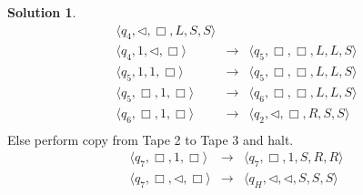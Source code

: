 \documentclass[12pt,a4paper]{article}
\theoremstyle{definition}
\newtheorem*{solution}{Solution}
\numberwithin{equation}{section}
\numberwithin{figure}{section}
\begin{document}
\begin{enumerate}
\begin{solution}
\begin{eqnarray*}
    \langle q_4, \triangleleft,\Box, L, S, S   \rangle \\
     \langle q_4,1,\triangleleft,  \Box  \rangle & \rightarrow &
    \langle q_5, \Box,\Box, L, L, S   \rangle \\
     \langle q_5,1,1,  \Box  \rangle & \rightarrow &
    \langle q_5, \Box,\Box, L, L, S   \rangle \\
    \langle q_5, \Box ,1,  \Box  \rangle & \rightarrow &
    \langle q_6, \Box,\Box, L, L, S   \rangle \\
    \langle q_6, \Box ,1,  \Box  \rangle & \rightarrow &
    \langle q_2, \triangleleft,\Box, R, S, S   \rangle \\
    \end{eqnarray*}
    Else perform copy from Tape 2 to Tape 3 and halt.
     \begin{eqnarray*}
   \langle q_7,\Box ,1,  \Box  \rangle & \rightarrow &
    \langle q_7, \Box,1, S, R, R   \rangle \\
     \langle q_7,\Box ,\triangleleft,  \Box  \rangle & \rightarrow &
    \langle q_H, \triangleleft,\triangleleft, S, S, S   \rangle \\
    \end{eqnarray*}

    \end{solution}

\end{enumerate}


\end{document}
